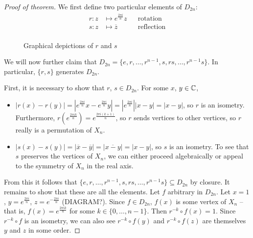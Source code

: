 \documentclass{../template/note}
\begin{document}
    \begin{proof}[Proof of theorem]
        We first define two particular elements of \(D_{2n}\):
        \begin{align*}
            r: z &\mapsto e^{\frac{2 \pi i}{n}}z && \text{rotation} \\
            s: z &\mapsto \overline{z} && \text{reflection} \\
        \end{align*}

        \begin{figure}[ht]
            \centering
            \caption{Graphical depictions of \(r\) and \(s\)}
            \label{fig:dihedral-group-operations}
        \end{figure}      

        We will now further claim that \(D_{2n} = \{e, r, \dots, r^{n-1}, s, rs, \dots, r^{n-1}s\}\). In particular, \(\{r, s\}\) generates \(D_{2n}\).

        First, it is necessary to show that \(r\), \(s \in D_{2n}\). For some \(x\), \(y \in \mathbb C\),
        \begin{itemize}
            \item \(|r(x) - r(y)| = |e^{\frac{2 \pi i}{n}} x - e^{\frac{2 \pi i}{n}} y| = |e^{\frac{2 \pi i}{n}}||x - y| = |x-y|\), so \(r\) is an isometry. Furthermore, \(r(e^{\frac{2 \pi i k}{n}}) = e^{\frac{2 \pi i (k+1)}{n}}\), so \(r\) sends vertices to other vertices, so \(r\) really is a permutation of \(X_n\).
            \item \(|s(x) - s(y)| = |\overline{x} - \overline{y}| = |\overline{x-y}| = |x-y|\), so \(s\) is an isometry. To see that \(s\) preserves the vertices of \(X_n\), we can either proceed algebraically or appeal to the symmetry of \(X_n\) in the real axis.
        \end{itemize}
        
        From this it follows that \(\{e, r, \dots, r^{n-1}, s, rs, \dots, r^{n-1}s\} \subseteq D_{2n}\) by closure. It remains to show that these are all the elements. Let \(f\) arbitrary in \(D_{2n}\). Let \(x=1\), \(y=e^{\frac{2\pi i}{n}}\), \(z=e^{-\frac{2\pi i}{n}}\) (DIAGRAM?). Since \(f \in D_{2n}\), \(f(x)\) is some vertex of \(X_n\) -- that is, \(f(x) = e^{\frac{2 \pi i k}{n}}\) for some \(k \in \{0, \dots, n-1\}\). Then \(r^{-k} \circ f(x) = 1\). Since \(r^{-k} \circ f\) is an isometry, we can also see \(r^{-k} \circ f(y)\) and \(r^{-k} \circ f(z)\) are themselves \(y\) and \(z\) in some order.


\end{proof}
\end{document}
